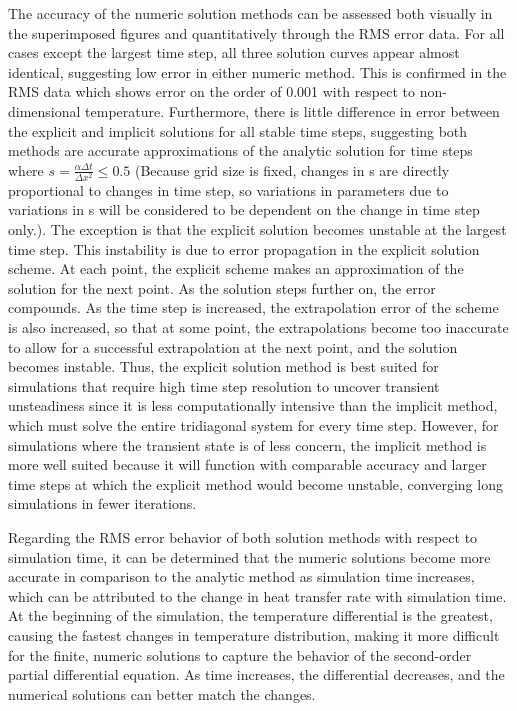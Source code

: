 \documentclass[twocolumn,10pt]{asme2ej}
\begin{document}
The accuracy of the numeric solution methods can be assessed both visually in the superimposed figures and quantitatively through the RMS error data.  For all cases except the largest time step,  all three solution curves appear almost identical, suggesting low error in either numeric method.  This is confirmed in the RMS data which shows error on the order of 0.001 with respect to non-dimensional temperature.  Furthermore, there is little difference in error between the explicit and implicit solutions for all stable time steps, suggesting both methods are accurate approximations of the analytic solution for time steps where $s = \frac{\alpha \Delta t}{\Delta x^2} \leq 0.5$ (Because grid size is fixed, changes in s are directly proportional to changes in time step, so variations in parameters due to variations in s will be considered to be dependent on the change in time step only.).  The exception is that the explicit solution becomes unstable at the largest time step.  This instability is due to error propagation in the explicit solution scheme.  At each point, the explicit scheme makes an approximation of the solution for the next point.  As the solution steps further on, the error compounds.  As the time step is increased, the extrapolation error of the scheme is also increased, so that at some point, the extrapolations become too inaccurate to allow for a successful extrapolation at the next point, and the solution becomes instable.  Thus, the explicit solution method is best suited for simulations that require high time step resolution to uncover transient unsteadiness since it is less computationally intensive than the implicit method, which must solve the entire tridiagonal system for every time step. However, for simulations where the transient state is of less concern, the implicit method is more well suited because it will function with comparable accuracy and larger time steps at which the explicit method would become unstable, converging long simulations in fewer iterations.

Regarding the RMS error behavior of both solution methods with respect to simulation time, it can be determined that the numeric solutions become more accurate in comparison to the analytic method as simulation time increases, which can be attributed to the change in heat transfer rate with simulation time.  At the beginning of the simulation, the temperature differential is the greatest, causing the fastest changes in temperature distribution, making it more difficult for the finite, numeric solutions to capture the behavior of the second-order partial differential equation.  As time increases, the differential decreases, and the numerical solutions can better match the changes.
\end{document}
